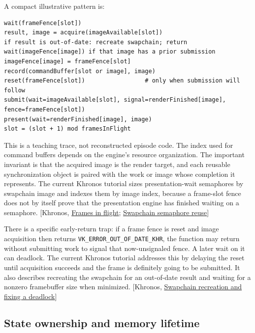A compact illustrative pattern is:

\begin{verbatim}
wait(frameFence[slot])
result, image = acquire(imageAvailable[slot])
if result is out-of-date: recreate swapchain; return
wait(imageFence[image]) if that image has a prior submission
imageFence[image] = frameFence[slot]
record(commandBuffer[slot or image], image)
reset(frameFence[slot])                 # only when submission will follow
submit(wait=imageAvailable[slot], signal=renderFinished[image], fence=frameFence[slot])
present(wait=renderFinished[image], image)
slot = (slot + 1) mod framesInFlight
\end{verbatim}

This is a teaching trace, not reconstructed episode code. The index used for command buffers depends on the engine's resource organization. The important invariant is that the acquired image is the render target, and each reusable synchronization object is paired with the work or image whose completion it represents. The current Khronos tutorial sizes presentation-wait semaphores by swapchain image and indexes them by image index, because a frame-slot fence does not by itself prove that the presentation engine has finished waiting on a semaphore. {[}Khronos, \href{https://docs.vulkan.org/tutorial/latest/03_Drawing_a_triangle/03_Drawing/03_Frames_in_flight.html}{Frames in flight}; \href{https://docs.vulkan.org/guide/latest/swapchain_semaphore_reuse.html}{Swapchain semaphore reuse}{]}

There is a specific early-return trap: if a frame fence is reset and image acquisition then returns \texttt{VK\_ERROR\_OUT\_OF\_DATE\_KHR}, the function may return without submitting work to signal that now-unsignaled fence. A later wait on it can deadlock. The current Khronos tutorial addresses this by delaying the reset until acquisition succeeds and the frame is definitely going to be submitted. It also describes recreating the swapchain for an out-of-date result and waiting for a nonzero framebuffer size when minimized. {[}Khronos, \href{https://docs.vulkan.org/tutorial/latest/03_Drawing_a_triangle/04_Swap_chain_recreation.html}{Swapchain recreation and fixing a deadlock}{]}

\subsection{State ownership and memory lifetime}\label{05-engine-i-ch014-state-ownership-and-memory-lifetime}

